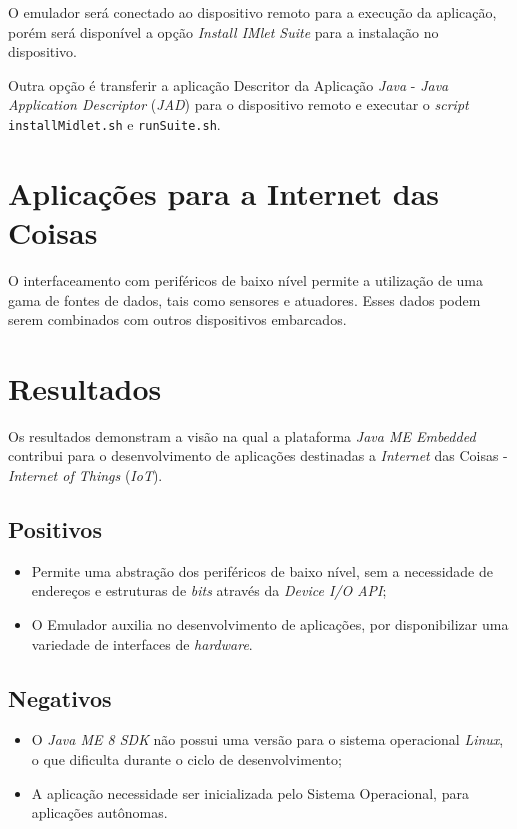 O emulador será conectado ao dispositivo remoto para a execução da aplicação, 
porém será disponível a opção \textit{Install IMlet Suite} para a instalação no 
dispositivo.

Outra opção é transferir a aplicação Descritor da Aplicação \textit{Java} - 
\textit{Java Application Descriptor} (\textit{JAD}) para o dispositivo remoto e 
executar o \textit{script} \verb|installMidlet.sh| e \verb|runSuite.sh|.

\section{Aplicações para a Internet das Coisas}

O interfaceamento com periféricos de baixo nível permite a utilização de uma 
gama de fontes de dados, tais como sensores e atuadores. Esses dados podem 
serem combinados com outros dispositivos embarcados.

\section{Resultados}

Os resultados demonstram a visão na qual a plataforma \textit{Java ME Embedded} 
contribui para o desenvolvimento de aplicações destinadas a \textit{Internet} 
das Coisas - \textit{Internet of Things} (\textit{IoT}).

\subsection{Positivos}

\begin{itemize}
    
    \item Permite uma abstração dos periféricos de baixo nível, sem a 
    necessidade de endereços e estruturas de \textit{bits} através da 
    \textit{Device I/O API};
    
    \item O Emulador auxilia no desenvolvimento de aplicações, por 
    disponibilizar uma variedade de interfaces de \textit{hardware}.
    
\end{itemize}

\subsection{Negativos}

\begin{itemize}
    
    \item O \textit{Java ME 8 SDK} não possui uma versão para o sistema 
    operacional \textit{Linux}, o que dificulta durante o ciclo de 
    desenvolvimento;
    
    \item A aplicação necessidade ser inicializada pelo Sistema Operacional, 
    para aplicações autônomas.
    
\end{itemize}
